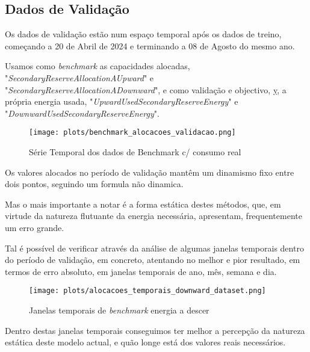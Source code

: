 \subsection{Dados de Validação}
Os dados de validação estão num espaço temporal após os dados de treino, começando a 20 de Abril de 2024 e terminando a 08 de Agosto do mesmo ano.\par
Usamos como \textit{benchmark} as capacidades alocadas, "\textit{SecondaryReserveAllocationAUpward}" e "\textit{SecondaryReserveAllocationADownward}", e como validação e objectivo, \hyperref[se:metneuralnet]{y}, a própria energia usada, "\textit{UpwardUsedSecondaryReserveEnergy}" e "\textit{DownwardUsedSecondaryReserveEnergy}".

\begin{figure}[H]
    \centering
    \texttt{[image: plots/benchmark\_alocacoes\_validacao.png]}
    \caption{Série Temporal dos dados de Benchmark c/ consumo real}
    \label{fig:benchmarktimeseries}
\end{figure}

Os valores alocados no período de validação mantêm um dinamismo fixo entre dois pontos, seguindo um formula não dinamica. \par
Mas o mais importante a notar é a forma estática destes métodos, que, em virtude da natureza flutuante da energia necessária, apresentam, frequentemente um erro grande.\par
Tal é possível de verificar através da análise de algumas janelas temporais dentro do período de validação, em concreto, atentando no melhor e pior resultado, em termos de erro absoluto, em janelas temporais de ano, mês, semana e dia.\par




\begin{figure}[H]
    \centering
    \texttt{[image: plots/alocacoes\_temporais\_downward\_dataset.png]}
    \caption{Janelas temporais de \textit{benchmark} energia a descer}
    \label{fig:benchmarktimewindowsdown}
\end{figure}

Dentro destas janelas temporais conseguimos ter melhor a percepção da natureza estática deste modelo actual, e quão longe está dos valores reais necessários.\par

